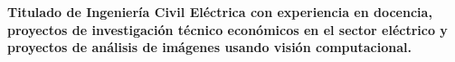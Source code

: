\sectionsep
\begingroup
\fontsize{12pt}{14pt}\selectfont
\textbf{Titulado de Ingeniería Civil Eléctrica con experiencia en docencia, proyectos de investigación técnico económicos en el sector eléctrico y proyectos de análisis de imágenes usando visión computacional.}
\endgroup
\sectionsep